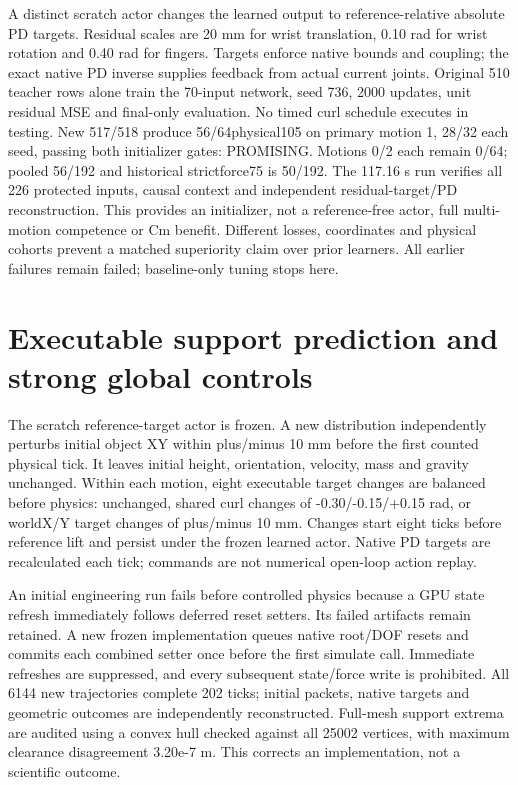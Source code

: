 \documentclass[10pt]{article}
\begin{document}
A distinct scratch actor changes the learned output to reference-relative absolute
PD targets. Residual scales are 20 mm for wrist translation, 0.10 rad for wrist
rotation and 0.40 rad for fingers. Targets enforce native bounds and coupling;
the exact native PD inverse supplies feedback from actual current joints.
Original 510 teacher rows alone train the 70-input network, seed 736, 2000 updates,
unit residual MSE and final-only evaluation. No timed curl schedule executes
in testing. New 517/518 produce 56/64physical105 on primary motion 1, 28/32 each seed,
passing both initializer gates: PROMISING. Motions 0/2 each remain 0/64;
pooled 56/192 and historical strictforce75 is 50/192. The 117.16 s run verifies all 226
protected inputs, causal context and independent residual-target/PD reconstruction.
This provides an initializer, not a reference-free actor, full multi-motion
competence or Cm benefit. Different losses, coordinates and physical cohorts
prevent a matched superiority claim over prior learners. All earlier failures
remain failed; baseline-only tuning stops here.

\begin{table}[h]
\centering

\caption{Independent learned-policy evaluations: physical105 is the new prospective primary and strictforce75 is a historical secondary. All variants retain all three motions. These are initializer Probes, without Cm or policy-training utility claims.}
\end{table}


\section{Executable support prediction and strong global controls}
The scratch reference-target actor is frozen. A new distribution independently
perturbs initial object XY within plus/minus 10 mm before the first counted physical
tick. It leaves initial height, orientation, velocity, mass and gravity unchanged.
Within each motion, eight executable target changes are balanced before physics:
unchanged, shared curl changes of -0.30/-0.15/+0.15 rad, or worldX/Y target changes
of plus/minus 10 mm. Changes start eight ticks before reference lift and persist
under the frozen learned actor. Native PD targets are recalculated each tick;
commands are not numerical open-loop action replay.

An initial engineering run fails before controlled physics because a GPU state
refresh immediately follows deferred reset setters. Its failed artifacts remain
retained. A new frozen implementation queues native root/DOF resets and commits
each combined setter once before the first simulate call. Immediate refreshes
are suppressed, and every subsequent state/force write is prohibited. All 6144
new trajectories complete 202 ticks; initial packets, native targets and geometric
outcomes are independently reconstructed. Full-mesh support extrema are audited
using a convex hull checked against all 25002 vertices, with maximum clearance
disagreement 3.20e-7 m. This corrects an implementation, not a scientific outcome.
\end{document}
